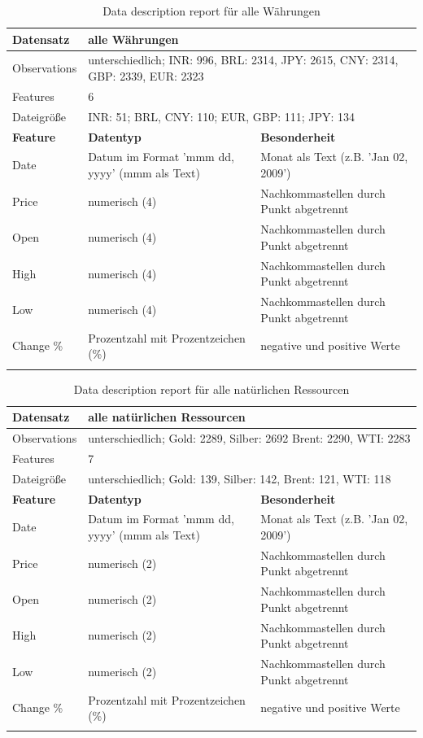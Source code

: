\begin{longtable}[!h]{|p{5cm}|p{4cm}|p{5cm}|}
\hline
Datensatz & \multicolumn{2}{l|}{alle Währungen} \\ \hline
Observations & \multicolumn{2}{p{9cm}|}{unterschiedlich; INR: 996, BRL: 2314, JPY: 2615, CNY: 2314, GBP: 2339, EUR: 2323}\\ \hline
Features & \multicolumn{2}{l|}{6} \\ \hline
Dateigröße & \multicolumn{2}{l|}{INR: 51; BRL, CNY: 110; EUR, GBP: 111; JPY: 134 } \\ \hline
\hhline{===}
\textbf{Feature} & \textbf{Datentyp} & \textbf{Besonderheit}\\ 
\hhline{===}
Date & Datum im Format 'mmm dd, yyyy' (mmm als Text) & Monat als Text (z.B. 'Jan 02, 2009') \\ \hline
Price & numerisch (4) & Nachkommastellen durch Punkt abgetrennt \\ \hline 
Open &  numerisch (4) & Nachkommastellen durch Punkt abgetrennt \\ \hline 
High &  numerisch (4) & Nachkommastellen durch Punkt abgetrennt \\ \hline 
Low &  numerisch (4) & Nachkommastellen durch Punkt abgetrennt \\ \hline 
Change \% & Prozentzahl mit Prozentzeichen (\%) & negative und positive Werte \\ \hline
\caption{Data description report für alle Währungen}
\end{longtable}

\begin{longtable}[!h]{|p{5cm}|p{4cm}|p{5cm}|}
\hline
Datensatz & \multicolumn{2}{l|}{alle natürlichen Ressourcen} \\ \hline
Observations & \multicolumn{2}{p{9cm}|}{unterschiedlich; Gold: 2289, Silber: 2692 Brent: 2290, WTI: 2283}\\ \hline
Features & \multicolumn{2}{l|}{7} \\ \hline
Dateigröße & \multicolumn{2}{l|}{unterschiedlich; Gold: 139, Silber: 142, Brent: 121, WTI: 118} \\ \hline
\hhline{===}
\textbf{Feature} & \textbf{Datentyp} & \textbf{Besonderheit}\\ 
\hhline{===}
Date & Datum im Format 'mmm dd, yyyy' (mmm als Text) & Monat als Text (z.B. 'Jan 02, 2009') \\ \hline
Price & numerisch (2) & Nachkommastellen durch Punkt abgetrennt \\ \hline 
Open &  numerisch (2) & Nachkommastellen durch Punkt abgetrennt \\ \hline 
High &  numerisch (2) & Nachkommastellen durch Punkt abgetrennt \\ \hline 
Low &  numerisch (2) & Nachkommastellen durch Punkt abgetrennt \\ \hline 
Change \% & Prozentzahl mit Prozentzeichen (\%) & negative und positive Werte \\ \hline
\caption{Data description report für alle natürlichen Ressourcen}
\end{longtable}

